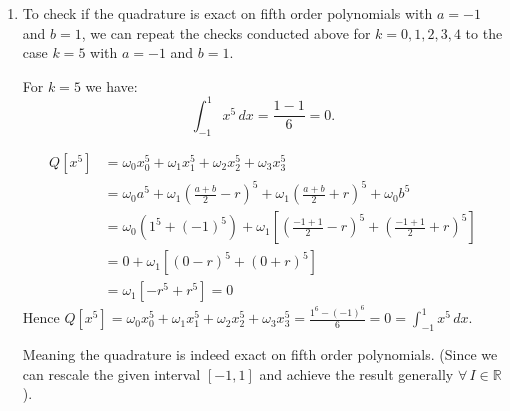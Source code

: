 \documentclass[]{article}
\begin{document}
\begin{enumerate}
\begin{itemize}
\begin{align*}
&\text{Hence to obtain exactness on fourth order polynomials, we require }:\\
&(b-a)^{2}=20r^{2} \implies r=\frac{b-a}{2\sqrt{5}}\\
&\text{I.e. given } r=\frac{b-a}{2\sqrt{5}}, \text{ it holds that: }\\
&Q[x^4]=\omega_0 x_0^4 +\omega_1x_1^4+\omega_2x_2^4+\omega_3 x_3^4=\frac{b^5-a^5}{5}=\int_a^b x^4\,dx
\end{align*}
\end{itemize}
Since we have now shown that the quadrature is exact on the monomials $x^k ;k=0,1,2, 3$ and, provided that $r = \frac{b-a}{2\sqrt{5}}$, also for $k=4$. It therefore holds by the linearity of the integral operator that the quadrature is exact on all polynomials of order four or less. I.e.:
\[
\text{Given }r=\frac{b-a}{2\sqrt{5}}, \, a,b\in \mathbb{R}, f\in \mathcal{P}_4\,:\, \mathcal{E}_{\mathcal{Q}_{a}^{b}}\,[f] = 0
\]


\item To check if the quadrature is exact on fifth order polynomials with $a = -1$ and $b = 1$, we can repeat the checks conducted above for $k=0,1,2,3,4$ to the case $k=5$  with $a = -1$ and $b = 1$.\newline


For $k=5$ we have:
\[
\int_{-1}^1 x^5\,dx=\frac{1-1}{6} = 0.
\]

\begin{align*}
Q[x^5]
&=\omega_0 x_0^5+\omega_1 x_1^5+\omega_2 x_2^5+\omega_3 x_3^5\\
&=\omega_0 a^5+\omega_1\left(\frac{a+b}{2}-r\right)^{\!5}
+\omega_1\left(\frac{a+b}{2}+r\right)^{\!5}
+\omega_0 b^5\\
&=\omega_0(1^5+(-1)^5)+\omega_1\!\left[\left(\frac{-1+1}{2}-r\right)^{\!5}+\left(\frac{-1+1}{2}+r\right)^{\!5}\right]\\
&=0 +\omega_1\!\left[\left(0-r\right)^{\!5}+\left(0+r\right)^{\!5}\right]\\
&=\omega_1\!\left[-r^{\!5}+r^{\!5}\right] = 0
\end{align*}
Hence \(Q[x^5]=\omega_0 x_0^5 +\omega_1x_1^5+\omega_2x_2^5+\omega_3 x_3^5=\frac{1^6-(-1)^6}{6}=0=\int_{-1}^1 x^5\,dx\).\newline

\noindent Meaning the quadrature is indeed exact on fifth order polynomials. (Since we can rescale the given interval $[-1,1]$ and achieve the result generally $\forall \, I \in \mathbb{R}$).
\end{enumerate}
\hrulefill
\end{document}
